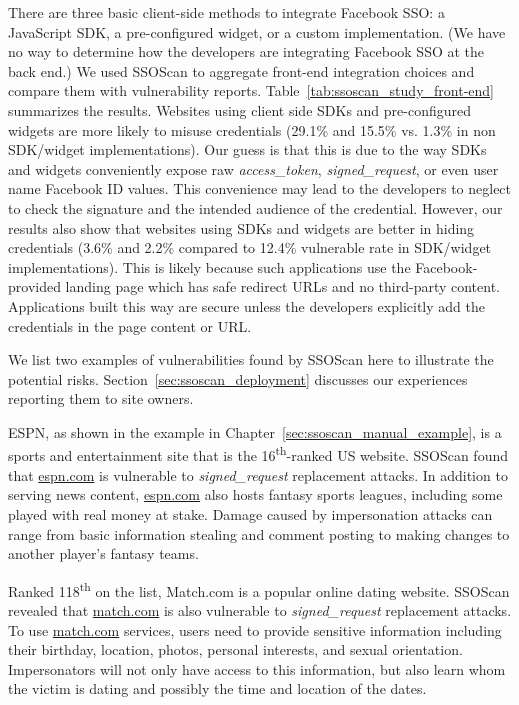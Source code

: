  There are three basic client-side methods to integrate Facebook SSO: a JavaScript SDK, a pre-configured widget, or a custom implementation.  (We have no way to determine how the developers are integrating Facebook SSO at the back end.)  We used SSOScan to aggregate front-end integration choices and compare them with vulnerability reports.  Table~\ref{tab:ssoscan_study_front-end} summarizes the results.  Websites using client side SDKs and pre-configured widgets are more likely to misuse credentials (29.1\% and 15.5\% vs. 1.3\% in non SDK/widget implementations).  Our guess is that this is due to the way SDKs and widgets conveniently expose raw \emph{access\_token}, \emph{signed\_request}, or even user name Facebook ID values.  This convenience may lead to the developers to neglect to check the signature and the intended audience of the credential.  However, our results also show that websites using SDKs and widgets are better in hiding credentials (3.6\% and 2.2\% compared to 12.4\% vulnerable rate in SDK/widget implementations).  This is likely because such applications use the Facebook-provided landing page which has safe redirect URLs and no third-party content.  Applications built this way are secure unless the developers explicitly add the credentials in the page content or URL.



 We list two examples of vulnerabilities found by SSOScan here to illustrate the potential risks.  Section~\ref{sec:ssoscan_deployment} discusses our experiences reporting them to site owners.

 ESPN, as shown in the example in Chapter~\ref{sec:ssoscan_manual_example}, is a sports and entertainment site that is the 16\textsuperscript{th}-ranked US website.  SSOScan found that \url{espn.com} is vulnerable to \emph{signed\_request} replacement attacks.  In addition to serving news content, \url{espn.com} also hosts fantasy sports leagues, including some played with real money at stake.  Damage caused by impersonation attacks can range from basic information stealing and comment posting to making changes to another player's fantasy teams.

 Ranked 118\textsuperscript{th} on the list, Match.com is a popular online dating website.  SSOScan revealed that \url{match.com} is also vulnerable to \emph{signed\_request} replacement attacks.  To use \url{match.com} services, users need to provide sensitive information including their birthday, location, photos, personal interests, and sexual orientation.  Impersonators will not only have access to this information, but also learn whom the victim is dating and possibly the time and location of the dates.


